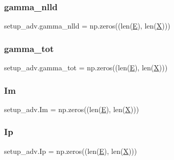 \mbox{\label{namespacesetup__adv_aebb51cf4468b9017ab51b2c90f1609cc}} 
\subsubsection{\texorpdfstring{gamma\+\_\+nlld}{gamma\_nlld}}
{\footnotesize\ttfamily setup\+\_\+adv.\+gamma\+\_\+nlld = np.\+zeros((len(\hyperlink{namespacesetup__adv_a5934fd9692b0afe75afd78fb1f301443}{E}), len(\hyperlink{namespacesetup__adv_a6d9cd2ec966fe51739f30fabc346a12b}{X})))}

\mbox{\label{namespacesetup__adv_ac0a5ebb1d693d1a582e1c26b26718b5c}} 
\subsubsection{\texorpdfstring{gamma\+\_\+tot}{gamma\_tot}}
{\footnotesize\ttfamily setup\+\_\+adv.\+gamma\+\_\+tot = np.\+zeros((len(\hyperlink{namespacesetup__adv_a5934fd9692b0afe75afd78fb1f301443}{E}), len(\hyperlink{namespacesetup__adv_a6d9cd2ec966fe51739f30fabc346a12b}{X})))}

\mbox{\label{namespacesetup__adv_aedea5f0e0b81e0132b4538991ee14041}} 
\subsubsection{\texorpdfstring{Im}{Im}}
{\footnotesize\ttfamily setup\+\_\+adv.\+Im = np.\+zeros((len(\hyperlink{namespacesetup__adv_a5934fd9692b0afe75afd78fb1f301443}{E}), len(\hyperlink{namespacesetup__adv_a6d9cd2ec966fe51739f30fabc346a12b}{X})))}

\mbox{\label{namespacesetup__adv_a8196da8fc3bb124883e8ea02b26e722e}} 
\subsubsection{\texorpdfstring{Ip}{Ip}}
{\footnotesize\ttfamily setup\+\_\+adv.\+Ip = np.\+zeros((len(\hyperlink{namespacesetup__adv_a5934fd9692b0afe75afd78fb1f301443}{E}), len(\hyperlink{namespacesetup__adv_a6d9cd2ec966fe51739f30fabc346a12b}{X})))}

